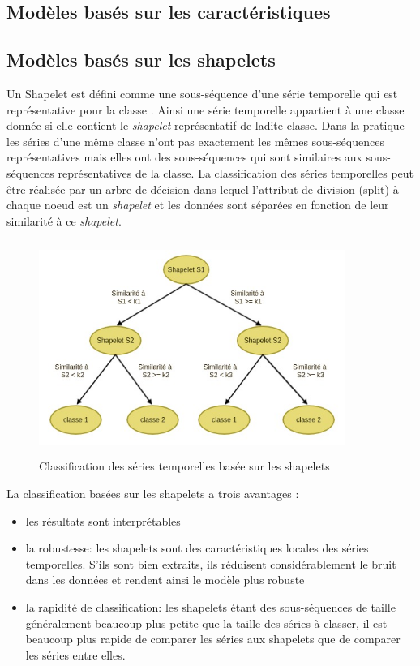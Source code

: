 \subsection{Modèles basés sur les caractéristiques}\label{sec:feature_based_model}

\subsection{Modèles basés sur les shapelets}\label{sec:shapelet_based_model}
Un Shapelet est défini comme une sous-séquence d'une série temporelle qui est représentative pour la classe \citep{ye2009time}. Ainsi une série temporelle appartient à une classe donnée si elle contient le \textit{shapelet} représentatif de ladite classe. Dans la pratique les séries d'une même classe n'ont pas exactement les mêmes sous-séquences représentatives mais elles ont des sous-séquences qui sont similaires aux sous-séquences représentatives de la classe. 
La classification des séries temporelles peut être réalisée par un arbre de décision dans lequel l'attribut de division (split) à chaque noeud est un \textit{shapelet} et les données sont séparées en fonction de leur similarité à ce \textit{shapelet}.

\begin{figure}[!h]
    \centering
    \includegraphics[width=10cm,height=7cm]{report/figures/shapelet-based-tree.jpg}
    \caption{Classification des séries temporelles basée sur les shapelets}
    \label{fig:my_label}
\end{figure}

La classification basées sur les shapelets a trois avantages \citep{ye2009time}:
\begin{itemize}
    \item les résultats sont interprétables 
    \item la robustesse: les shapelets sont des caractéristiques locales des séries temporelles. S'ils sont bien extraits, ils réduisent considérablement le bruit dans les données et rendent ainsi le modèle plus robuste
    \item la rapidité de classification: les shapelets étant des sous-séquences de taille généralement beaucoup plus petite que la taille des séries à classer, il est beaucoup plus rapide de comparer les séries aux shapelets que de comparer les séries entre elles.
\end{itemize}

